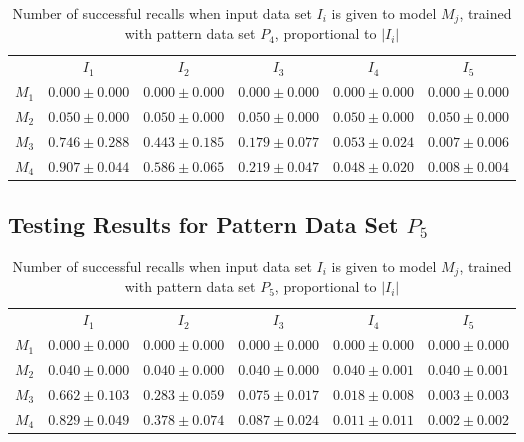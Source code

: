 \documentclass[anon]{CI}
\begin{document}
		\begin{table}[H]
			\centering
			\def\arraystretch{1.5}
			\footnotesize
			\begin{tabular}{cccccc}
				
				& $I_{1}$  & $I_{2}$  & $I_{3}$  & $I_{4}$  & $I_{5}$ \\ \cline{2-6}
				$M_{1}$  & $0.000\pm0.000$  & $0.000\pm0.000$  & $0.000\pm0.000$  & $0.000\pm0.000$  & $0.000\pm0.000$ \\
				$M_{2}$  & $0.050\pm0.000$  & $0.050\pm0.000$  & $0.050\pm0.000$  & $0.050\pm0.000$  & $0.050\pm0.000$ \\
				$M_{3}$  & $0.746\pm0.288$  & $0.443\pm0.185$  & $0.179\pm0.077$  & $0.053\pm0.024$  & $0.007\pm0.006$ \\
				$M_{4}$  & $0.907\pm0.044$  & $0.586\pm0.065$  & $0.219\pm0.047$  & $0.048\pm0.020$  & $0.008\pm0.004$ \\
				
			\end{tabular}
			\caption{Number of successful recalls when input data set $I_i$ is given to model $M_j$, trained with pattern data set $P_{4}$, proportional to $\left|I_i\right|$}
		\end{table}
		
		\subsection{Testing Results for Pattern Data Set $P_{5}$}
		
		
		\begin{table}[H]
			\centering
			\def\arraystretch{1.5}
			\footnotesize
			\begin{tabular}{cccccc}
				
				& $I_{1}$  & $I_{2}$  & $I_{3}$  & $I_{4}$  & $I_{5}$ \\ \cline{2-6}
				$M_{1}$  & $0.000\pm0.000$  & $0.000\pm0.000$  & $0.000\pm0.000$  & $0.000\pm0.000$  & $0.000\pm0.000$ \\
				$M_{2}$  & $0.040\pm0.000$  & $0.040\pm0.000$  & $0.040\pm0.000$  & $0.040\pm0.001$  & $0.040\pm0.001$ \\
				$M_{3}$  & $0.662\pm0.103$  & $0.283\pm0.059$  & $0.075\pm0.017$  & $0.018\pm0.008$  & $0.003\pm0.003$ \\
				$M_{4}$  & $0.829\pm0.049$  & $0.378\pm0.074$  & $0.087\pm0.024$  & $0.011\pm0.011$  & $0.002\pm0.002$ \\
				
			\end{tabular}
			\caption{Number of successful recalls when input data set $I_i$ is given to model $M_j$, trained with pattern data set $P_{5}$, proportional to $\left|I_i\right|$}
		\end{table}
		
\end{document}
